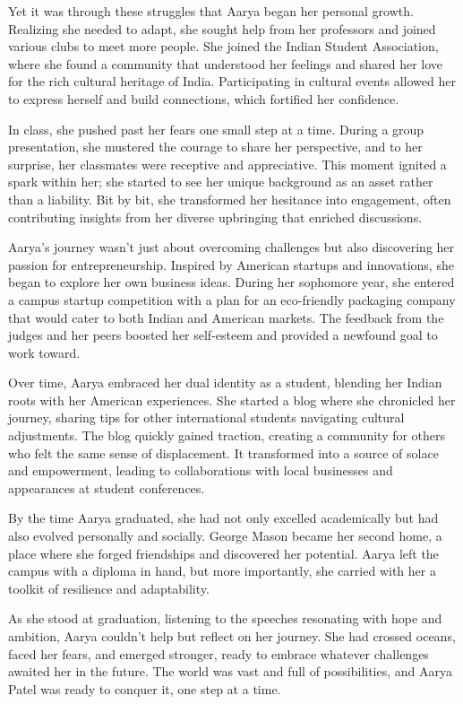 \documentclass[11pt,addpoints,answers]{exam}
\begin{document}
\begin{questions}
\begin{tcolorbox}[fit,height=22cm, width=16cm, blank, borderline={1pt}{-2pt},nobeforeafter]
Yet it was through these struggles that Aarya began her personal growth. Realizing she needed to adapt, she sought help from her professors and joined various clubs to meet more people. She joined the Indian Student Association, where she found a community that understood her feelings and shared her love for the rich cultural heritage of India. Participating in cultural events allowed her to express herself and build connections, which fortified her confidence.

In class, she pushed past her fears one small step at a time. During a group presentation, she mustered the courage to share her perspective, and to her surprise, her classmates were receptive and appreciative. This moment ignited a spark within her; she started to see her unique background as an asset rather than a liability. Bit by bit, she transformed her hesitance into engagement, often contributing insights from her diverse upbringing that enriched discussions.

Aarya's journey wasn’t just about overcoming challenges but also discovering her passion for entrepreneurship. Inspired by American startups and innovations, she began to explore her own business ideas. During her sophomore year, she entered a campus startup competition with a plan for an eco-friendly packaging company that would cater to both Indian and American markets. The feedback from the judges and her peers boosted her self-esteem and provided a newfound goal to work toward.

Over time, Aarya embraced her dual identity as a student, blending her Indian roots with her American experiences. She started a blog where she chronicled her journey, sharing tips for other international students navigating cultural adjustments. The blog quickly gained traction, creating a community for others who felt the same sense of displacement. It transformed into a source of solace and empowerment, leading to collaborations with local businesses and appearances at student conferences.

By the time Aarya graduated, she had not only excelled academically but had also evolved personally and socially. George Mason became her second home, a place where she forged friendships and discovered her potential. Aarya left the campus with a diploma in hand, but more importantly, she carried with her a toolkit of resilience and adaptability.

As she stood at graduation, listening to the speeches resonating with hope and ambition, Aarya couldn’t help but reflect on her journey. She had crossed oceans, faced her fears, and emerged stronger, ready to embrace whatever challenges awaited her in the future. The world was vast and full of possibilities, and Aarya Patel was ready to conquer it, one step at a time.


\end{tcolorbox}
\end{questions}
\end{document}
